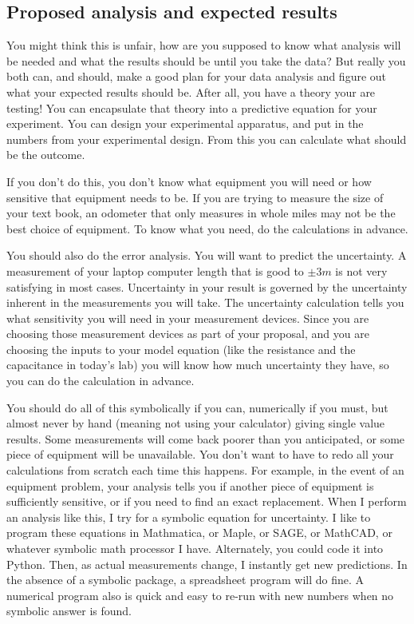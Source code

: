 \subsection{Proposed analysis and expected results}

You might think this is unfair, how are you supposed to know what analysis will be needed and what the results should be until you take the data? But really you both can, and should, make a good plan for your data analysis and figure out what your expected results should be. After all, you have a theory your are testing! You can encapsulate that theory into a predictive equation for your experiment. You can design your experimental apparatus, and put in the numbers from your experimental design. From this you can calculate what should be the outcome.

If you don't do this, you don't know what equipment you will need or how sensitive that equipment needs to be. If you are trying to measure the size of your text book, an odometer that only measures in whole miles may not be the best choice of equipment. To know what you need, do the calculations in advance.

You should also do the error analysis. You will want to predict the uncertainty. A measurement of your laptop computer length that is good to $\pm 3\unit{m}$ is not very satisfying in most cases. Uncertainty in your result is governed by the uncertainty inherent in the measurements you will take. The uncertainty calculation tells you what sensitivity you will need in your measurement devices. Since you are choosing those measurement devices as part of your proposal, and you are choosing the inputs to your model equation (like the resistance and the capacitance in today's lab) you will know how much uncertainty they have, so you can do the calculation in advance.

You should do all of this symbolically if you can, numerically if you must, but almost never by hand (meaning not using your calculator) giving single value results. Some measurements will come back poorer than you anticipated, or some piece of equipment will be unavailable. You don't want to have to redo all your calculations from scratch each time this happens. For example, in the event of an equipment problem, your analysis tells you if another piece of equipment is sufficiently sensitive, or if you need to find an exact replacement. When I perform an analysis like this, I try for a symbolic equation for uncertainty. I like to program these equations in Mathmatica, or Maple, or SAGE, or MathCAD, or whatever symbolic math processor I have. Alternately, you could code it into Python. Then, as actual measurements change, I instantly get new predictions. In the absence of a symbolic package, a spreadsheet program will do fine. A numerical program also is quick and easy to re-run with new numbers when no symbolic answer is found.

